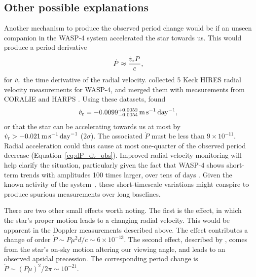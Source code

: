 \documentclass[12pt,twocolumn,tighten]{aastex62}
\begin{document}
\subsection{Other possible explanations}

Another mechanism to produce the observed period change would be if an
unseen companion in the WASP-4 system accelerated the star towards us.
This would produce a period derivative
\begin{equation}
	\dot{P} \approx \frac{\dot{v}_{\rm r} P}{c},
\end{equation}
for $\dot{v}_{\rm r}$ the time derivative of the radial velocity.
\citet{knutson_friends_2014} collected 5 Keck HIRES radial
velocity measurements for WASP-4, and merged them with measurements
from CORALIE and HARPS \citep{wilson_wasp-4b_2008,pont_determining_2011,husnoo_observational_2012}.
Using these datasets, \citet{knutson_friends_2014} found 
\begin{equation}
\dot{v}_{\rm r} =
   -0.0099^{+0.0052}_{-0.0054}
   \,{\rm m}\,{\rm s}^{-1}\,{\rm day}^{-1},
\end{equation}
or that the
star can be accelerating towards us at most by $\dot{v}_{\rm r} > -
0.021 \,{\rm m}\,{\rm s}^{-1}\,{\rm day}^{-1}$ (2$\sigma$).
The associated $\dot{P}$ must be less than $9\times 10^{-11}$.  
Radial acceleration could thus cause at most one-quarter of the
observed period decrease (Equation~\ref{eq:dP_dt_obs}).
Improved radial velocity
monitoring will help clarify the situation,
particularly given the fact that WASP-4 shows short-term trends with
amplitudes 100 times larger, over tens of days
\citep{husnoo_observational_2012}.  Given the known activity of the
system~\citep{sanchis-ojeda_starspots_2011}, these short-timescale
variations might conspire to produce spurious measurements over long
baselines.

There are two other small effects worth noting.  The first is the
\citet{shklovskii_possible_1970} effect, in which the star's proper
motion leads to a changing radial velocity.  This would be apparent in
the Doppler measurements described above.  The effect contributes a
change of order $\dot{P} \sim P\mu^2 d/ c \sim 6\times10^{-13}$.  The
second effect, described by \citet{rafikov_stellar_2009}, comes from
the star's on-sky motion altering our viewing angle, and leads to an
observed apsidal precession.  The corresponding period change is
$\dot{P} \sim (P\mu)^2/2\pi \sim 10^{-21}$.
\end{document}
